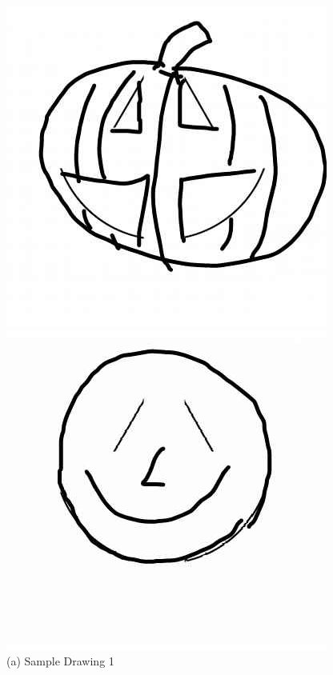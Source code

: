\documentclass[../Proposal.tex]{subfiles}
\begin{document}
\begin{figure}[]
    \centering
    \begin{minipage}{0.45\textwidth}
        \centering
        \includegraphics[width=\linewidth]{sample_drawing_AuDrA/example1.jpg}
        \caption*{(a) Sample Drawing 1}
    \end{minipage}\hfill
    \begin{minipage}{0.45\textwidth}
        \centering
        \includegraphics[width=\linewidth]{sample_drawing_AuDrA/example2.jpg}

\end{minipage}
\end{figure}
\end{document}
